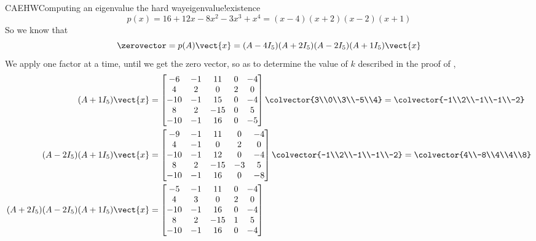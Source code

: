 \begin{example}{CAEHW}{Computing an eigenvalue the hard way}{eigenvalue!existence}
%
\begin{equation*}
p(x)=16+12x-8x^2-3x^3+x^4=(x-4)(x+2)(x-2)(x+1)
\end{equation*}
%
So we know that 
%
\begin{equation*}
\zerovector=p(A)\vect{x}=(A-4I_5)(A+2I_5)(A-2I_5)(A+1I_5)\vect{x}
\end{equation*}
%
We apply one factor at a time, until we get the zero vector, so as to determine the value of $k$ described in the proof of ,
%
\begin{align*}
(A+1I_5)\vect{x}&=
\begin{bmatrix}
-6 & -1 & 11 & 0 & -4\\ 
4 & 2 & 0 & 2 & 0\\ 
-10 & -1 & 15 & 0 & -4\\ 
8 & 2 & -15 & 0 & 5\\ 
-10 & -1 & 16 & 0 & -5
\end{bmatrix}
\colvector{3\\0\\3\\-5\\4}
=
\colvector{-1\\2\\-1\\-1\\-2}\\
%
(A-2I_5)(A+1I_5)\vect{x}&=
\begin{bmatrix}
-9 & -1 & 11 & 0 & -4\\ 
4 & -1 & 0 & 2 & 0\\ 
-10 & -1 & 12 & 0 & -4\\ 
8 & 2 & -15 & -3 & 5\\ 
-10 & -1 & 16 & 0 & -8
\end{bmatrix}
\colvector{-1\\2\\-1\\-1\\-2}
=
\colvector{4\\-8\\4\\4\\8}\\
%
(A+2I_5)(A-2I_5)(A+1I_5)\vect{x}&=
\begin{bmatrix}
-5 & -1 & 11 & 0 & -4\\ 
4 & 3 & 0 & 2 & 0\\ 
-10 & -1 & 16 & 0 & -4\\ 
8 & 2 & -15 & 1 & 5\\ 
-10 & -1 & 16 & 0 & -4

\end{bmatrix}
\end{align*}
\end{example}
